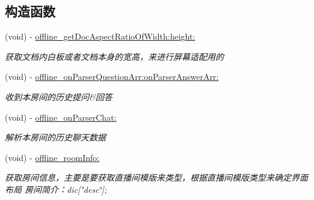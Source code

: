 \subsection*{构造函数}
\begin{DoxyCompactItemize}
\item 
\mbox{\label{protocol_offline_play_back_delegate_01-p_a1ee776037831d9c6f44a635f19be821a}} 
(void) -\/ \hyperlink{protocol_offline_play_back_delegate_01-p_a1ee776037831d9c6f44a635f19be821a}{offline\+\_\+get\+Doc\+Aspect\+Ratio\+Of\+Width\+:height\+:}
\begin{DoxyCompactList}\small\item\em 获取文档内白板或者文档本身的宽高，来进行屏幕适配用的 \end{DoxyCompactList}\item 
\mbox{\label{protocol_offline_play_back_delegate_01-p_a4a95cda1929dc7cb1ed2b248a7542d38}} 
(void) -\/ \hyperlink{protocol_offline_play_back_delegate_01-p_a4a95cda1929dc7cb1ed2b248a7542d38}{offline\+\_\+on\+Parser\+Question\+Arr\+:on\+Parser\+Answer\+Arr\+:}
\begin{DoxyCompactList}\small\item\em 收到本房间的历史提问\&回答 \end{DoxyCompactList}\item 
\mbox{\label{protocol_offline_play_back_delegate_01-p_abb9d5988a67cf4cdc583d1782709146f}} 
(void) -\/ \hyperlink{protocol_offline_play_back_delegate_01-p_abb9d5988a67cf4cdc583d1782709146f}{offline\+\_\+on\+Parser\+Chat\+:}
\begin{DoxyCompactList}\small\item\em 解析本房间的历史聊天数据 \end{DoxyCompactList}\item 
\mbox{\label{protocol_offline_play_back_delegate_01-p_a89a33f4e08be57b1019c80f508bf2bb0}} 
(void) -\/ \hyperlink{protocol_offline_play_back_delegate_01-p_a89a33f4e08be57b1019c80f508bf2bb0}{offline\+\_\+room\+Info\+:}
\begin{DoxyCompactList}\small\item\em 获取房间信息，主要是要获取直播间模版来类型，根据直播间模版类型来确定界面布局 房间简介：dic\mbox{[}"desc\char`\"{}\mbox{]};

\end{DoxyCompactList}
\end{DoxyCompactItemize}
